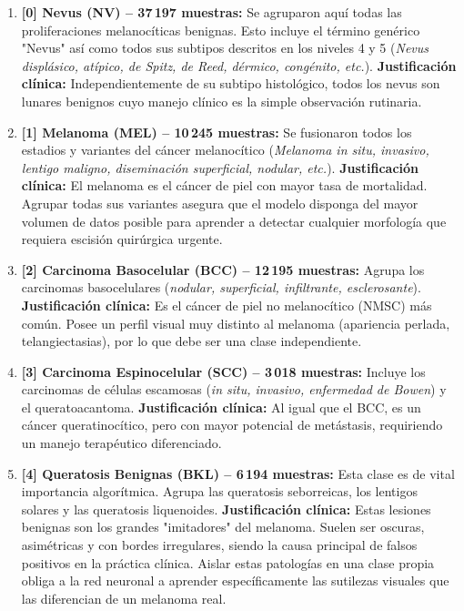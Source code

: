 \begin{enumerate}
	\item \textbf{[0] Nevus (NV) -- 37\,197 muestras:} 
	Se agruparon aquí todas las proliferaciones melanocíticas benignas. Esto incluye el término genérico "Nevus" así como todos sus subtipos descritos en los niveles 4 y 5 (\textit{Nevus displásico, atípico, de Spitz, de Reed, dérmico, congénito, etc.}). \textbf{Justificación clínica:} Independientemente de su subtipo histológico, todos los nevus son lunares benignos cuyo manejo clínico es la simple observación rutinaria.
	
	\item \textbf{[1] Melanoma (MEL) -- 10\,245 muestras:}
	Se fusionaron todos los estadios y variantes del cáncer melanocítico (\textit{Melanoma in situ, invasivo, lentigo maligno, diseminación superficial, nodular, etc.}). \textbf{Justificación clínica:} El melanoma es el cáncer de piel con mayor tasa de mortalidad. Agrupar todas sus variantes asegura que el modelo disponga del mayor volumen de datos posible para aprender a detectar cualquier morfología que requiera escisión quirúrgica urgente.
	
	\item \textbf{[2] Carcinoma Basocelular (BCC) -- 12\,195 muestras:}
	Agrupa los carcinomas basocelulares (\textit{nodular, superficial, infiltrante, esclerosante}). \textbf{Justificación clínica:} Es el cáncer de piel no melanocítico (NMSC) más común. Posee un perfil visual muy distinto al melanoma (apariencia perlada, telangiectasias), por lo que debe ser una clase independiente.
	
	\item \textbf{[3] Carcinoma Espinocelular (SCC) -- 3\,018 muestras:}
	Incluye los carcinomas de células escamosas (\textit{in situ, invasivo, enfermedad de Bowen}) y el queratoacantoma. \textbf{Justificación clínica:} Al igual que el BCC, es un cáncer queratinocítico, pero con mayor potencial de metástasis, requiriendo un manejo terapéutico diferenciado.
	
	\item \textbf{[4] Queratosis Benignas (BKL) -- 6\,194 muestras:}
	Esta clase es de vital importancia algorítmica. Agrupa las queratosis seborreicas, los lentigos solares y las queratosis liquenoides. \textbf{Justificación clínica:} Estas lesiones benignas son los grandes "imitadores" del melanoma. Suelen ser oscuras, asimétricas y con bordes irregulares, siendo la causa principal de falsos positivos en la práctica clínica. Aislar estas patologías en una clase propia obliga a la red neuronal a aprender específicamente las sutilezas visuales que las diferencian de un melanoma real.
	

\end{enumerate}
